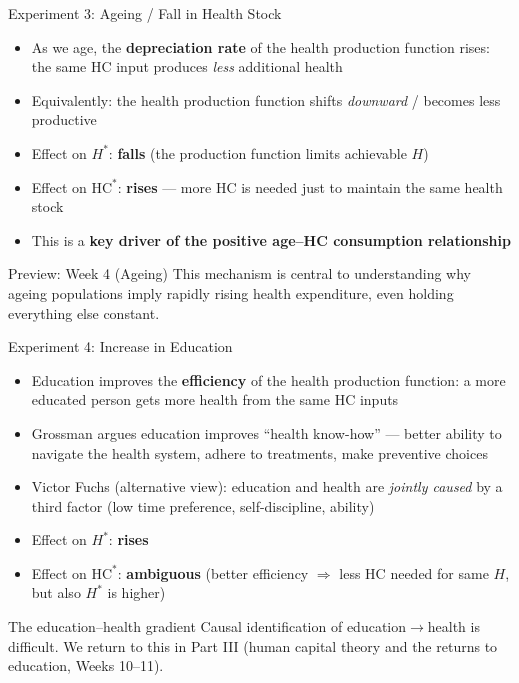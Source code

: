\documentclass[aspectratio=169, 12pt]{beamer}
\begin{document}
\begin{frame}{Experiment 3: Ageing / Fall in Health Stock}
  \begin{itemize}
    \item As we age, the \textbf{depreciation rate} of the health production function rises:
          the same HC input produces \emph{less} additional health
    \item Equivalently: the health production function shifts \emph{downward} / becomes less
          productive
    \item Effect on \textbf{$H^*$}: \textcolor{OtagoGold!80!black}{\textbf{falls}} (the production function limits achievable $H$)
    \item Effect on \textbf{$\text{HC}^*$}: \textcolor{OtagoBlue}{\textbf{rises}} --- more HC is needed just to maintain the same health stock
    \item This is a \textbf{key driver of the positive age--HC consumption relationship}
  \end{itemize}
  \begin{alertblock}{Preview: Week 4 (Ageing)}
    This mechanism is central to understanding why ageing populations imply rapidly rising
    health expenditure, even holding everything else constant.
  \end{alertblock}
\end{frame}

\begin{frame}{Experiment 4: Increase in Education}
  \begin{itemize}
    \item Education improves the \textbf{efficiency} of the health production function:
          a more educated person gets more health from the same HC inputs
    \item Grossman argues education improves ``health know-how'' --- better ability to
          navigate the health system, adhere to treatments, make preventive choices
    \item Victor Fuchs (alternative view): education and health are \emph{jointly caused}
          by a third factor (low time preference, self-discipline, ability)
    \item Effect on \textbf{$H^*$}: \textcolor{OtagoBlue}{\textbf{rises}}
    \item Effect on \textbf{$\text{HC}^*$}: \textbf{ambiguous} (better efficiency $\Rightarrow$ less HC needed
          for same $H$, but also $H^*$ is higher)
  \end{itemize}
  \begin{block}{The education--health gradient}
    Causal identification of education$\rightarrow$health is difficult. We return to
    this in Part III (human capital theory and the returns to education, Weeks 10--11).
  \end{block}
\end{frame}
\end{document}
